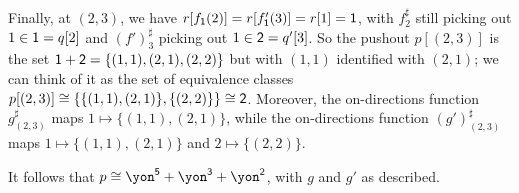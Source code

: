 \documentclass[Book-Poly]{subfiles}
\begin{document}
\begin{exercise}
\begin{solution}
\begin{enumerate}
    Finally, at $(2,3)$, we have $r[f_{\textsf{1}}(2)] = r[f'_{\textsf{1}}(3)] = r[1] = \textsf{1}$, with $f^\sharp_2$ still picking out $1 \in \textsf{1} = q[2]$ and $(f')^\sharp_3$ picking out $1 \in \textsf{2} = q'[3]$.
    So the pushout $p[(2,3)]$ is the set $\textsf{1} + \textsf{2} = \{(1,1), (2,1), (2,2)\}$ but with $(1,1)$ identified with $(2,1)$; we can think of it as the set of equivalence classes $p[(2,3)] \cong \{\{(1,1), (2,1)\}, \{(2,2)\}\} \cong \textsf{2}$.
    Moreover, the on-directions function $g^\sharp_{(2,3)}$ maps $1 \mapsto \{(1,1), (2,1)\}$, while the on-directions function $(g')^\sharp_{(2,3)}$ maps $1 \mapsto \{(1,1), (2,1)\}$ and $2 \mapsto \{(2,2)\}$.

    It follows that $p \iso \yon^\5 + \yon^\3 + \yon^\2$, with $g$ and $g'$ as described.
\end{enumerate}
\end{solution}
\end{exercise}
\end{document}
